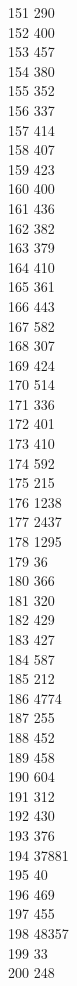 { 151	290 \\
 152	400 \\
 153	457 \\
 154	380 \\
 155	352 \\
 156	337 \\
 157	414 \\
 158	407 \\
 159	423 \\
 160	400 \\
 161	436 \\
 162	382 \\
 163	379 \\
 164	410 \\
 165	361 \\
 166	443 \\
 167	582 \\
 168	307 \\
 169	424 \\
 170	514 \\
 171	336 \\
 172	401 \\
 173	410 \\
 174	592 \\
 175	215 \\
 176	1238 \\
 177	2437 \\
 178	1295 \\
 179	36 \\
 180	366 \\
 181	320 \\
 182	429 \\
 183	427 \\
 184	587 \\
 185	212 \\
 186	4774 \\
 187	255 \\
 188	452 \\
 189	458 \\
 190	604 \\
 191	312 \\
 192	430 \\
 193	376 \\
 194	37881 \\
 195	40 \\
 196	469 \\
 197	455 \\
 198	48357 \\
 199	33 \\
 200	248 \\
}
